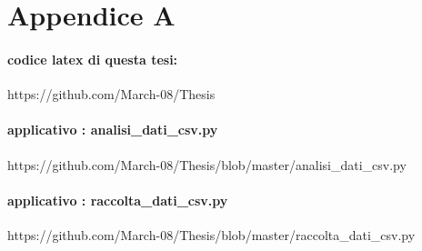 
\chapter*{Appendice A}

\subsubsection{codice latex di questa tesi:}
https://github.com/March-08/Thesis


\subsubsection{applicativo : analisi\_dati\_csv.py}
https://github.com/March-08/Thesis/blob/master/analisi\_dati\_csv.py


\subsubsection{applicativo : raccolta\_dati\_csv.py}
https://github.com/March-08/Thesis/blob/master/raccolta\_dati\_csv.py
